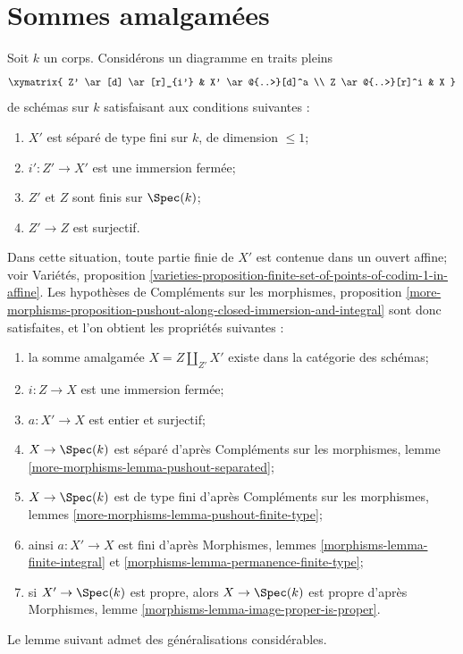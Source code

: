 \section{Sommes amalgamées}
\label{section-pushouts}

\noindent
Soit $k$ un corps. Considérons un diagramme en traits pleins $$
\xymatrix{
Z' \ar[d] \ar[r]_{i'} & X' \ar@{..>}[d]^a \\
Z \ar@{..>}[r]^i & X
}
$$ de schémas sur $k$ satisfaisant aux conditions suivantes : \begin{enumerate} \item[(a)] $X'$ est séparé de type fini sur $k$, de dimension $\leq 1$; \item[(b)] $i' : Z' \to X'$ est une immersion fermée; \item[(c)] $Z'$ et $Z$ sont finis sur $\Spec(k)$; \item[(d)] $Z' \to Z$ est surjectif. \end{enumerate} Dans cette situation, toute partie finie de $X'$ est contenue dans un ouvert affine; voir Variétés, proposition \ref{varieties-proposition-finite-set-of-points-of-codim-1-in-affine}. Les hypothèses de Compléments sur les morphismes, proposition \ref{more-morphisms-proposition-pushout-along-closed-immersion-and-integral} sont donc satisfaites, et l'on obtient les propriétés suivantes : \begin{enumerate} \item la somme amalgamée $X = Z \amalg_{Z'} X'$ existe dans la catégorie des schémas; \item $i : Z \to X$ est une immersion fermée; \item $a : X' \to X$ est entier et surjectif; \item $X \to \Spec(k)$ est séparé d'après Compléments sur les morphismes, lemme \ref{more-morphisms-lemma-pushout-separated}; \item $X \to \Spec(k)$ est de type fini d'après Compléments sur les morphismes, lemmes \ref{more-morphisms-lemma-pushout-finite-type}; \item ainsi $a : X' \to X$ est fini d'après Morphismes, lemmes \ref{morphisms-lemma-finite-integral} et \ref{morphisms-lemma-permanence-finite-type}; \item si $X' \to \Spec(k)$ est propre, alors $X \to \Spec(k)$ est propre d'après Morphismes, lemme \ref{morphisms-lemma-image-proper-is-proper}.
\end{enumerate}

\noindent
Le lemme suivant admet des généralisations considérables.

